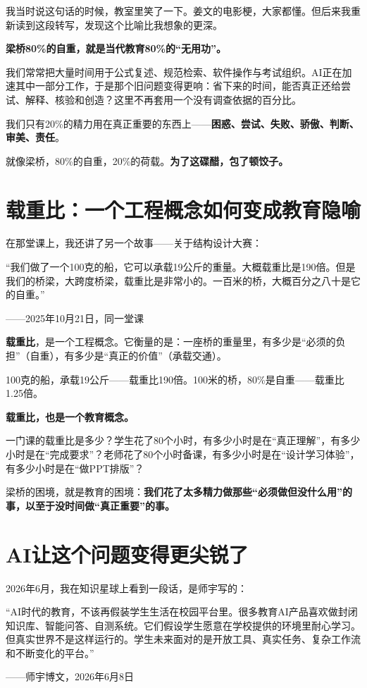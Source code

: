 我当时说这句话的时候，教室里笑了一下。姜文的电影梗，大家都懂。但后来我重新读到这段转写，发现这个比喻比我想象的更深。

\textbf{梁桥80\%的自重，就是当代教育80\%的``无用功''。}

我们常常把大量时间用于公式复述、规范检索、软件操作与考试组织。AI正在加速其中一部分工作，于是那个旧问题变得更响：省下来的时间，能否真正还给尝试、解释、核验和创造？这里不再套用一个没有调查依据的百分比。

我们只有20\%的精力用在真正重要的东西上——\textbf{困惑、尝试、失败、骄傲、判断、审美、责任}。

就像梁桥，80\%的自重，20\%的荷载。\textbf{为了这碟醋，包了顿饺子。}

\section{载重比：一个工程概念如何变成教育隐喻}

在那堂课上，我还讲了另一个故事——关于结构设计大赛：

\begin{shiyu-inline}
``我们做了一个100克的船，它可以承载19公斤的重量。大概载重比是190倍。但是我们的桥梁，大跨度桥梁，载重比是非常小的。一百米的桥，大概百分之八十是它的自重。''

\hfill ——2025年10月21日，同一堂课
\end{shiyu-inline}

\textbf{载重比}，是一个工程概念。它衡量的是：一座桥的重量里，有多少是``必须的负担''（自重），有多少是``真正的价值''（承载交通）。

100克的船，承载19公斤——载重比190倍。100米的桥，80\%是自重——载重比1.25倍。

\textbf{载重比，也是一个教育概念。}

一门课的载重比是多少？学生花了80个小时，有多少小时是在``真正理解''，有多少小时是在``完成要求''？老师花了80个小时备课，有多少小时是在``设计学习体验''，有多少小时是在``做PPT排版''？

梁桥的困境，就是教育的困境：\textbf{我们花了太多精力做那些``必须做但没什么用''的事，以至于没时间做``真正重要''的事。}

\section{AI让这个问题变得更尖锐了}

2026年6月，我在知识星球上看到一段话，是师宇写的：

\begin{shiyu-inline}
``AI时代的教育，不该再假装学生生活在校园平台里。很多教育AI产品喜欢做封闭知识库、智能问答、自测系统。它们假设学生愿意在学校提供的环境里耐心学习。但真实世界不是这样运行的。学生未来面对的是开放工具、真实任务、复杂工作流和不断变化的平台。''

\hfill ——师宇博文，2026年6月8日
\end{shiyu-inline}


